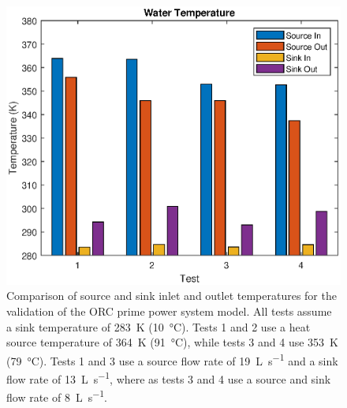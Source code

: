 \begin{figure}[p]
	\centering
	
	\includegraphics[width=\textwidth]{figures/VerificationWaterTemp01}
	
	\caption{Comparison of source and sink inlet and outlet temperatures for the validation of the ORC prime power system model. All tests assume a sink temperature of \SI{283}{\kelvin} (\SI{10}{\degreeCelsius}). Tests 1 and 2 use a heat source temperature of \SI{364}{\kelvin} (\SI{91}{\degreeCelsius}), while tests 3 and 4 use \SI{353}{\kelvin} (\SI{79}{\degreeCelsius}). Tests 1 and 3 use a source flow rate of \SI{19}{\liter\per\second} and a sink flow rate of \SI{13}{\liter\per\second}, where as tests 3 and 4 use a source and sink flow rate of \SI{8}{\liter\per\second}.
	}
	\label{fig:verificationWaterTemp01}
\end{figure}